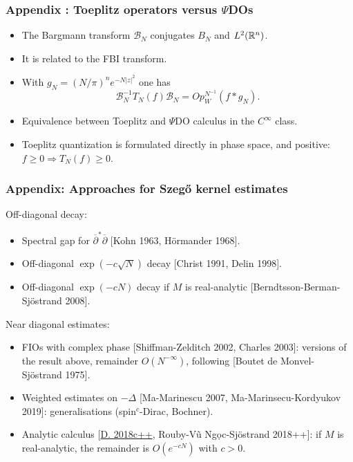 \documentclass[mathserif]{beamer}
\newcommand{\mycite}[1]{{\color{mygreen} \small #1}}
\begin{document}
  \begin{frame}
  \frametitle{Appendix : Toeplitz operators versus $\Psi$DOs}
  \begin{itemize}
  \item The Bargmann transform $\mathcal{B}_N$ conjugates $B_N$ and
    $L^2(\mathbb{R}^n)$.
  \item It is related to the FBI
    transform.
    \item With {\color{myorange} $g_N=(N/\pi)^ne^{-N|z|^2}$} one has
    \[
      \mathcal{B}_N^{-1}T_N(f)\mathcal{B}_N=Op_W^{N^{-1}}(f*g_N).
    \]\vspace{-2em}
\item Equivalence between Toeplitz and $\Psi$DO
  calculus in the $C^{\infty}$ class.
\item Toeplitz quantization is formulated {\color{myorange} directly in
  phase space}, and {\color{myorange} positive}: $f\geq 0\Rightarrow
T_N(f)\geq 0$.

  \end{itemize}
\end{frame}

\begin{frame}
  \frametitle{Appendix: Approaches for Szeg\H{o} kernel estimates}
  Off-diagonal decay:
  \begin{itemize}
  \item Spectral gap for $\overline{\partial}^*\overline{\partial}$
    \mycite{[Kohn 1963, Hörmander 1968]}.
  \item Off-diagonal $\exp(-c\sqrt{N})$ decay \mycite{[Christ 1991,
      Delin 1998]}.
  \item Off-diagonal $\exp(-cN)$ decay if $M$ is {\color{myorange} real-analytic}
    \mycite{[Berndtsson-Berman-Sjöstrand 2008]}.
  \end{itemize}

  Near diagonal estimates:
  \begin{itemize}
    \item FIOs with complex phase \mycite{[Shiffman-Zelditch 2002,
        Charles 2003]}: versions of
      the result above, remainder $O(N^{-\infty})$, following
      \mycite{[Boutet de Monvel-Sjöstrand 1975]}.
    \item Weighted estimates on $-\Delta$
      \mycite{[Ma-Marinescu 2007, Ma-Marinsecu-Kordyukov 2019]}:
      generalisations (spin$^c$-Dirac, Bochner).
    \item Analytic calculus \mycite{[\underline{D. 2018c++},
        Rouby-Vũ Ng\d{o}c-Sjöstrand 2018++]}: if $M$ is
      {\color{myorange} real-analytic},
      the remainder is $O(e^{-cN})$ with $c>0$.
    \end{itemize}
  \end{frame}
\end{document}
